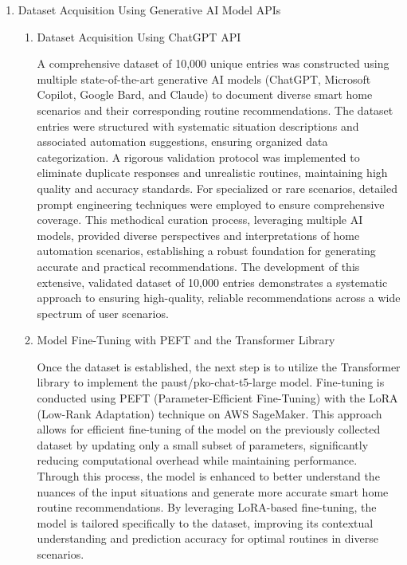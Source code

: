 \documentclass[conference]{IEEEtran}
\begin{document}
\begin{enumerate}[label=\arabic*]
    \item Dataset Acquisition Using Generative AI Model APIs\par
    \vspace{0.3em}

    \begin{enumerate}[label=\arabic*)] 
        \item Dataset Acquisition Using ChatGPT API\par
        \vspace{0.3em}
        A comprehensive dataset of 10,000 unique entries was constructed using multiple state-of-the-art generative AI models (ChatGPT, Microsoft Copilot, Google Bard, and Claude) to document diverse smart home scenarios and their corresponding routine recommendations. The dataset entries were structured with systematic situation descriptions and associated automation suggestions, ensuring organized data categorization. A rigorous validation protocol was implemented to eliminate duplicate responses and unrealistic routines, maintaining high quality and accuracy standards. For specialized or rare scenarios, detailed prompt engineering techniques were employed to ensure comprehensive coverage. This methodical curation process, leveraging multiple AI models, provided diverse perspectives and interpretations of home automation scenarios, establishing a robust foundation for generating accurate and practical recommendations. The development of this extensive, validated dataset of 10,000 entries demonstrates a systematic approach to ensuring high-quality, reliable recommendations across a wide spectrum of user scenarios.

        \vspace{0.5em}

        \item Model Fine-Tuning with PEFT and the Transformer Library\par
        \vspace{0.3em}
        Once the dataset is established, the next step is to utilize the Transformer library to implement the paust/pko-chat-t5-large model. Fine-tuning is conducted using PEFT (Parameter-Efficient Fine-Tuning) with the LoRA (Low-Rank Adaptation) technique on AWS SageMaker. This approach allows for efficient fine-tuning of the model on the previously collected dataset by updating only a small subset of parameters, significantly reducing computational overhead while maintaining performance. Through this process, the model is enhanced to better understand the nuances of the input situations and generate more accurate smart home routine recommendations. By leveraging LoRA-based fine-tuning, the model is tailored specifically to the dataset, improving its contextual understanding and prediction accuracy for optimal routines in diverse scenarios.


\end{enumerate}
\end{enumerate}
\end{document}
